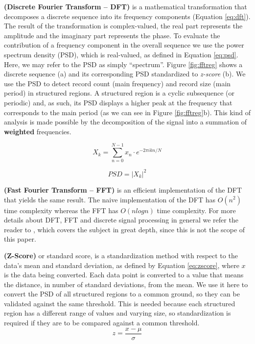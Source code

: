 \documentclass{vldb}
\begin{document}
\begin{definition}\textbf{(Discrete Fourier Transform -- DFT)}\label{def:dft} is
a mathematical transformation that decomposes a discrete sequence into its frequency components
(Equation \ref{eq:dft}). The result of the transformation is complex-valued, the
real part represents the amplitude and the imaginary part represents the phase.
To evaluate the contribution of a frequency component in the overall sequence we
use the power spectrum density (PSD), which is real-valued, as defined in
Equation \ref{eq:psd}. Here, we may refer to the PSD as simply ``spectrum''.
Figure \ref{fig:fftreg} shows a discrete sequence (a) and its corresponding PSD
standardized to \textit{z-score} (b). We use the PSD to detect record count
(main frequency) and record size (main period) in structured regions. A
structured region is a cyclic subsequence (or periodic) and, as such, its PSD
displays a higher peak at the frequency that corresponds to the main period (as
we can see in Figure \ref{fig:fftreg}b). This kind of analysis is made possible
by the decomposition of the signal into a summation of \textbf{weighted}
frequencies.

\begin{equation}\label{eq:dft}
    X_k=\sum_{n=0}^{N-1}{x_n\cdot e^{-2\pi ikn/N}}    
\end{equation}

\begin{equation}\label{eq:psd}
    PSD=|X_k|^2
\end{equation}

\end{definition}

\begin{definition}\textbf{(Fast Fourier Transform -- FFT)}\label{def:fft} is an
efficient implementation of the DFT that yields the same result. The naive implementation
of the DFT has $O(n^2)$ time complexity whereas the FFT has $O(nlogn)$ time
complexity. For more details about DFT, FFT and discrete signal
processing in general we refer the reader to \cite{oppenheim1989discrete},
which covers the subject in great depth, since this is not the scope of this
paper.
\end{definition}

\begin{definition}\textbf{(Z-Score)}\label{def:zscore} or standard
score\cite{CVeveritt2006cambridge}, is a standardization method with respect to
the data's mean and standard deviation, as defined by Equation \ref{eq:zscore},
where $x$ is the data being converted. Each data point is converted to a value
that means the distance, in number of standard deviations, from the mean.
We use it here to convert the PSD of all structured regions to a common ground, so they
can be validated against the same threshold. This is needed because each
structured region has a different range of values and varying size, so
standardization is required if they are to be compared against a common
threshold.
\begin{equation}\label{eq:zscore}
    z = \frac{x -\mu}{\sigma}
\end{equation}

\end{definition}
\end{document}

